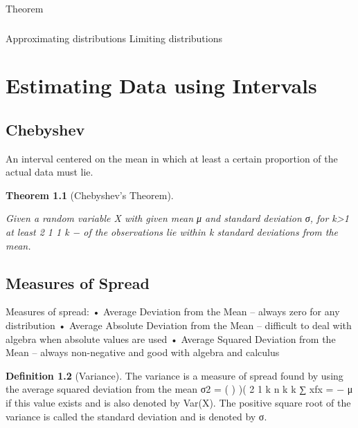 \documentclass[10pt,]{book}
\theoremstyle{plain}
\newtheorem{theorem}{Theorem}[section]
\theoremstyle{definition}
\newtheorem{definition}[theorem]{Definition}
\theoremstyle{definition}
\numberwithin{equation}{section}
\begin{document}
	Theorem
\typeout{************************************************}
\typeout{************************************************}
\subsection[]{}\label{subsection-28}

	Approximating distributions
	Limiting distributions
\typeout{************************************************}
\typeout{************************************************}
\chapter[Estimating Data using Intervals]{Estimating Data using Intervals}\label{IntervalEstimation}
\typeout{************************************************}
\typeout{************************************************}
\section[Chebyshev]{Chebyshev}\label{section-29}
An interval centered on the mean in which at least a certain proportion
	of the actual data must lie.
\begin{theorem}[Chebyshev's Theorem]\label{theorem-29}

	Given a random variable X with given mean μ and standard deviation σ, for k>1 at least
	2
	1 1
	k − of the observations lie within k standard deviations from the mean.
	\end{theorem}
\typeout{************************************************}
\typeout{************************************************}
\section[Measures of Spread]{Measures of Spread}\label{section-30}
Measures of spread:
• Average Deviation from the Mean – always zero for any distribution
• Average Absolute Deviation from the Mean – difficult to deal with algebra when absolute values are used
• Average Squared Deviation from the Mean – always non-negative and good with algebra and calculus 
%
\begin{definition}[Variance]\label{definition-14}
The variance is a measure of spread found by using the average squared deviation from the mean
σ2
 = ( ) )(
2
1
k
n
k
k ∑ xfx =
− μ
if this value exists and is also denoted by Var(X). The positive square root of the variance is called the standard deviation
and is denoted by σ. \end{definition}
\end{document}
